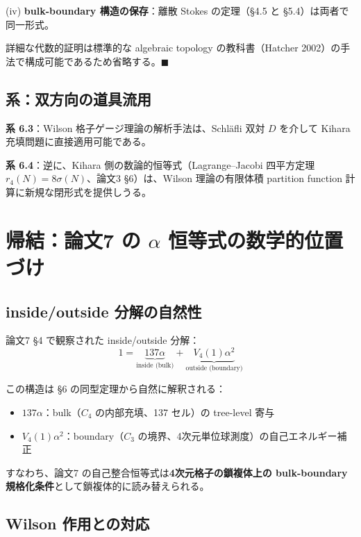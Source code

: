 \documentclass[a4paper,11pt]{ltjsarticle}
\begin{document}
(iv) \textbf{bulk-boundary 構造の保存}：離散 Stokes の定理（§4.5 と §5.4）は両者で同一形式。

詳細な代数的証明は標準的な algebraic topology の教科書（Hatcher 2002）の手法で構成可能であるため省略する。$\blacksquare$

\subsection{系：双方向の道具流用}

\textbf{系 6.3}：Wilson 格子ゲージ理論の解析手法は、Schläfli 双対 $D$ を介して Kihara 充填問題に直接適用可能である。

\textbf{系 6.4}：逆に、Kihara 側の数論的恒等式（Lagrange--Jacobi 四平方定理 $r_4(N) = 8\sigma(N)$、論文3 §6）は、Wilson 理論の有限体積 partition function 計算に新規な閉形式を提供しうる。

\section{帰結：論文7 の $\alpha$ 恒等式の数学的位置づけ}

\subsection{inside/outside 分解の自然性}

論文7 §4 で観察された inside/outside 分解：
\begin{equation}
1 = \underbrace{137 \alpha}_{\text{inside (bulk)}} + \underbrace{V_4(1) \alpha^2}_{\text{outside (boundary)}} \tag{7.1}
\end{equation}

この構造は §6 の同型定理から自然に解釈される：

\begin{itemize}
\item $137 \alpha$：bulk（$C_4$ の内部充填、137 セル）の tree-level 寄与
\item $V_4(1) \alpha^2$：boundary（$C_3$ の境界、4次元単位球測度）の自己エネルギー補正
\end{itemize}

すなわち、論文7 の自己整合恒等式は\textbf{4次元格子の鎖複体上の bulk-boundary 規格化条件}として鎖複体的に読み替えられる。

\subsection{Wilson 作用との対応}
\end{document}
